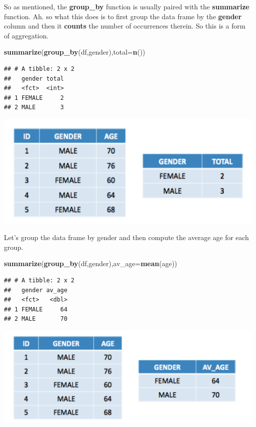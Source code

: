 \documentclass[]{book}
\newenvironment{Shaded}{\begin{snugshade}}{\end{snugshade}}
\newcommand{\DataTypeTok}[1]{\textcolor[rgb]{0.13,0.29,0.53}{#1}}
\newcommand{\KeywordTok}[1]{\textcolor[rgb]{0.13,0.29,0.53}{\textbf{#1}}}
\newcommand{\NormalTok}[1]{#1}
\begin{document}
So as mentioned, the \textbf{group\_by} function is usually paired with the \textbf{summarize} function. Ah. so what this does is to first group the data frame by the \textbf{gender} column and then it \textbf{counts} the number of occurrences therein. So this is a form of aggregation.

\begin{Shaded}
\begin{Highlighting}[]
\KeywordTok{summarize}\NormalTok{(}\KeywordTok{group_by}\NormalTok{(df,gender),}\DataTypeTok{total=}\KeywordTok{n}\NormalTok{())}
\end{Highlighting}
\end{Shaded}

\begin{verbatim}
## # A tibble: 2 x 2
##   gender total
##   <fct>  <int>
## 1 FEMALE     2
## 2 MALE       3
\end{verbatim}

\includegraphics{./figures/grp.png}

Let's group the data frame by gender and then compute the average age for each group.

\begin{Shaded}
\begin{Highlighting}[]
\KeywordTok{summarize}\NormalTok{(}\KeywordTok{group_by}\NormalTok{(df,gender),}\DataTypeTok{av_age=}\KeywordTok{mean}\NormalTok{(age))}
\end{Highlighting}
\end{Shaded}

\begin{verbatim}
## # A tibble: 2 x 2
##   gender av_age
##   <fct>   <dbl>
## 1 FEMALE     64
## 2 MALE       70
\end{verbatim}

\includegraphics{./figures/grpa.png}
\end{document}
